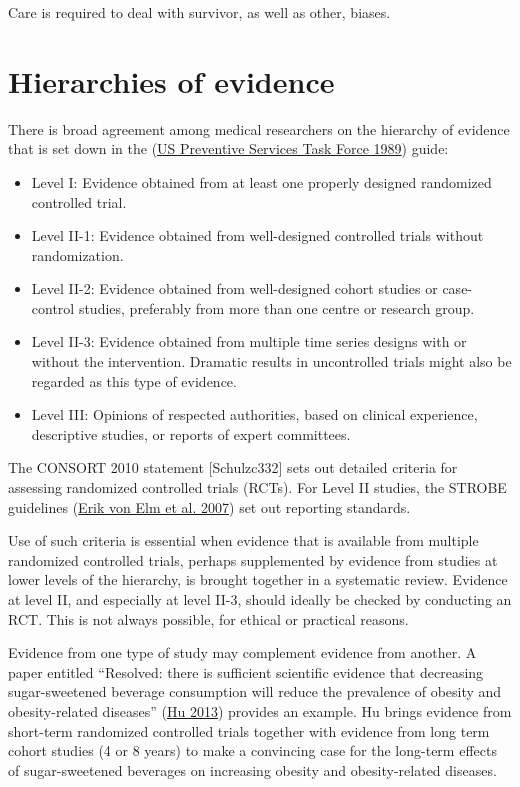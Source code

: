 \documentclass[
  10pt,
  b5paper]{book}
\providecommand{\tightlist}{%
  \setlength{\itemsep}{0pt}\setlength{\parskip}{0pt}}
\begin{document}
Care is required to deal with survivor, as well as other, biases.

\hypertarget{hierarchies-of-evidence}{%
\section{Hierarchies of evidence}\label{hierarchies-of-evidence}}

There is broad agreement among medical researchers on the
hierarchy of evidence that is set down in the (\protect\hyperlink{ref-us1989guide}{US Preventive Services Task Force 1989})
guide:

\begin{itemize}
\tightlist
\item
  Level I: Evidence obtained from at least one properly designed randomized controlled trial.
\item
  Level II-1: Evidence obtained from well-designed controlled trials without randomization.
\item
  Level II-2: Evidence obtained from well-designed cohort studies or case-control studies, preferably from more than one centre or research group.
\item
  Level II-3: Evidence obtained from multiple time series designs with or without the intervention. Dramatic results in uncontrolled trials might also be regarded as this type of evidence.
\item
  Level III: Opinions of respected authorities, based on clinical experience, descriptive studies, or reports of expert committees.
\end{itemize}

The CONSORT 2010 statement {[}Schulzc332{]} sets out detailed criteria
for assessing randomized controlled trials (RCTs). For Level II
studies, the STROBE guidelines (\protect\hyperlink{ref-erik2007strengthening}{Erik von Elm et al. 2007}) set out
reporting standards.

Use of such criteria is essential when evidence that is available
from multiple randomized controlled trials, perhaps supplemented
by evidence from studies at lower levels of the hierarchy, is
brought together in a systematic review. Evidence at level II,
and especially at level II-3, should ideally be checked by
conducting an RCT. This is not always possible, for ethical or
practical reasons.

Evidence from one type of study may complement evidence from
another. A paper entitled ``Resolved: there is sufficient
scientific evidence that decreasing sugar-sweetened beverage
consumption will reduce the prevalence of obesity and
obesity-related diseases'' (\protect\hyperlink{ref-hu2013resolved}{Hu 2013}) provides an
example. Hu brings evidence from short-term randomized
controlled trials together with evidence from long term
cohort studies (4 or 8 years) to make a convincing case
for the long-term effects of sugar-sweetened beverages on
increasing obesity and obesity-related diseases.
\end{document}
